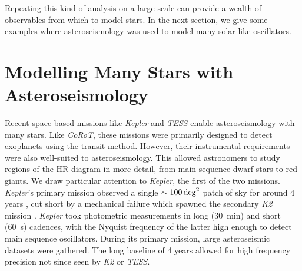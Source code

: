 

Repeating this kind of analysis on a large-scale can provide a wealth of observables from which to model stars. In the next section, we give some examples where asteroseismology was used to model many solar-like oscillators.

\section[Modelling Stars with Asteroseismology]{Modelling Many Stars with Asteroseismology}\label{sec:many-stars}

Recent space-based missions like \emph{Kepler} and \emph{TESS} enable asteroseismology with many stars. Like \emph{CoRoT}, these missions were primarily designed to detect exoplanets using the transit method. However, their instrumental requirements were also well-suited to asteroseismology. This allowed astronomers to study regions of the HR diagram in more detail, from main sequence dwarf stars to red giants. We draw particular attention to \emph{Kepler}, the first of the two missions. \emph{Kepler}'s primary mission observed a single \(\sim\SI{100}{deg\squared}\) patch of sky for around 4 years \citep{Borucki.Koch.ea2010}, cut short by a mechanical failure which spawned the secondary \emph{K2} mission \citep{Howell.Sobeck.ea2014}. \emph{Kepler} took photometric measurements in long (\SI{30}{\minute}) and short (\SI{60}{\second}) cadences, with the Nyquist frequency of the latter high enough to detect main sequence oscillators. During its primary mission, large asteroseismic datasets were gathered. The long baseline of 4 years allowed for high frequency precision not since seen by \emph{K2} or \emph{TESS}.

